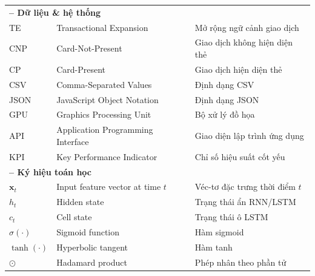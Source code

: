 \begin{longtable}{@{}p{2.5cm} p{6.5cm} p{5.5cm}@{}}
\multicolumn{3}{l}{\textbf{– Dữ liệu \& hệ thống}}\\
TE       & Transactional Expansion                  & Mở rộng ngữ cảnh giao dịch \\
CNP      & Card-Not-Present                         & Giao dịch không hiện diện thẻ \\
CP       & Card-Present                             & Giao dịch hiện diện thẻ \\
CSV      & Comma-Separated Values                   & Định dạng CSV \\
JSON     & JavaScript Object Notation               & Định dạng JSON \\
GPU      & Graphics Processing Unit                 & Bộ xử lý đồ họa \\
API      & Application Programming Interface        & Giao diện lập trình ứng dụng \\
KPI      & Key Performance Indicator                & Chỉ số hiệu suất cốt yếu \\[3pt]

\multicolumn{3}{l}{\textbf{– Ký hiệu toán học}}\\
$\mathbf{x}_t$ & Input feature vector at time $t$   & Véc-tơ đặc trưng thời điểm $t$ \\
$h_t$           & Hidden state                      & Trạng thái ẩn RNN/LSTM \\
$c_t$           & Cell state                        & Trạng thái ô LSTM \\
$\sigma(\cdot)$ & Sigmoid function                  & Hàm sigmoid \\
$\tanh(\cdot)$  & Hyperbolic tangent               & Hàm tanh \\
$\odot$         & Hadamard product                  & Phép nhân theo phần tử \\
\end{longtable}
\endgroup

\restoregeometry
\cleardoublepage
